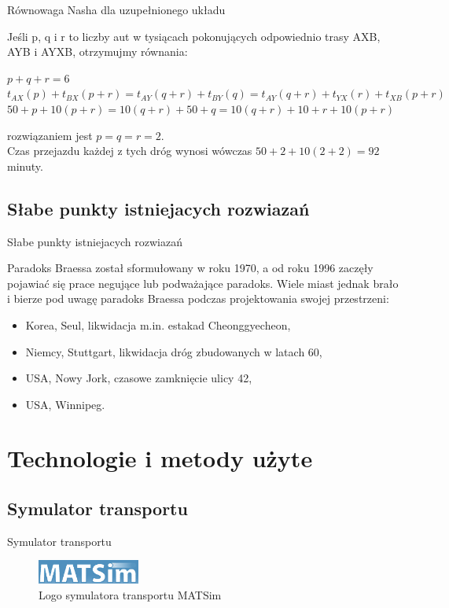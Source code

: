 \documentclass{beamer}
\begin{document}
\begin{frame}{Równowaga Nasha dla uzupełnionego układu\cite{braess}} 

Jeśli p, q i r to liczby aut w tysiącach pokonujących odpowiednio trasy AXB, AYB i AYXB, otrzymujmy równania:

\begin{center}
$p+q+r = 6 $\\
$t_{AX}(p)+t_{BX}(p+r) = t_{AY}(q+r) + t_{BY}(q) = t_{AY}(q+r)+t_{YX}(r)+t_{XB}(p+r)$
\newline\\
$50+p+10(p+r) = 10(q+r)+50+q = 10(q+r)+ 10 + r + 10(p+r)$
\end{center}
rozwiązaniem jest $p=q=r=2$.\\
Czas przejazdu każdej z tych dróg wynosi wówczas $50+2+10(2+2)=92$ minuty.
\end{frame}


\subsection{Słabe punkty istniejacych rozwiazań}
\begin{frame}{Słabe punkty istniejacych rozwiazań} 

Paradoks Braessa został sformułowany w roku 1970,
a od roku 1996 zaczęły pojawiać się prace negujące lub podważające paradoks\cite{newinsights}.
Wiele miast jednak brało i bierze pod uwagę paradoks Braessa podczas projektowania swojej przestrzeni:

\begin{itemize}
\item Korea, Seul, likwidacja m.in. estakad Cheonggyecheon,
\item Niemcy, Stuttgart, likwidacja dróg zbudowanych w latach 60,
\item USA, Nowy Jork, czasowe zamknięcie ulicy 42,
\item USA, Winnipeg.\cite{urban}
\end{itemize}  

\end{frame}


\section{Technologie i metody użyte}


\subsection{Symulator transportu}
\begin{frame}{Symulator transportu} 

	\begin{figure}[h!]
	\includegraphics[width=0.30\textwidth]{img/matsim}
	\caption{Logo symulatora transportu MATSim \cite{matsim}} 
	\end{figure}

\end{frame}
\end{document}

